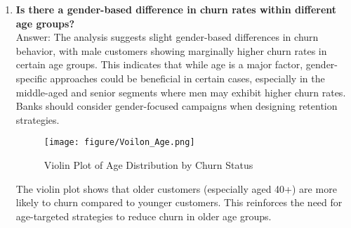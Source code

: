 \documentclass[12pt]{article}
\begin{document}
\begin{enumerate}
    \item \textbf{Is there a gender-based difference in churn rates within different age groups?}  \\
    Answer: The analysis suggests slight gender-based differences in churn behavior, with male customers showing marginally higher churn rates in certain age groups. This indicates that while age is a major factor, gender-specific approaches could be beneficial in certain cases, especially in the middle-aged and senior segments where men may exhibit higher churn rates. Banks should consider gender-focused campaigns when designing retention strategies.

    \begin{figure}[h]
    \vspace{25pt}
        \centering
        \texttt{[image: figure/Voilon\_Age.png]}  
        \caption{Violin Plot of Age Distribution by Churn Status}
            \label{fig:example}
       \vspace{0.5cm}
    \end{figure}

    The violin plot shows that older customers (especially aged 40+) are more likely to churn compared to younger customers. This reinforces the need for age-targeted strategies to reduce churn in older age groups.

\end{enumerate}

\newpage
\end{document}
